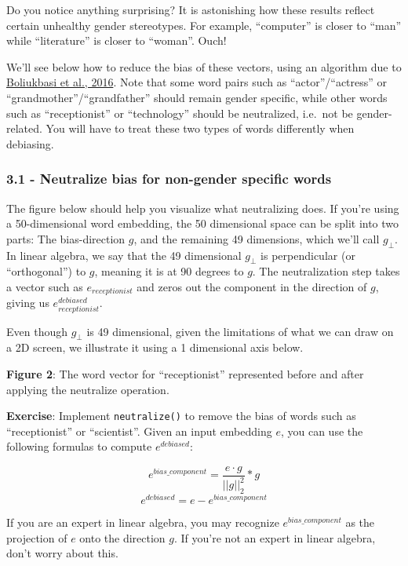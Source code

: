 \documentclass[11pt]{article}
\begin{document}
    Do you notice anything surprising? It is astonishing how these results
reflect certain unhealthy gender stereotypes. For example, ``computer''
is closer to ``man'' while ``literature'' is closer to ``woman''. Ouch!

We'll see below how to reduce the bias of these vectors, using an
algorithm due to \href{https://arxiv.org/abs/1607.06520}{Boliukbasi et
al., 2016}. Note that some word pairs such as ``actor''/``actress'' or
``grandmother''/``grandfather'' should remain gender specific, while
other words such as ``receptionist'' or ``technology'' should be
neutralized, i.e.~not be gender-related. You will have to treat these
two types of words differently when debiasing.

\subsubsection{3.1 - Neutralize bias for non-gender specific
words}\label{neutralize-bias-for-non-gender-specific-words}

The figure below should help you visualize what neutralizing does. If
you're using a 50-dimensional word embedding, the 50 dimensional space
can be split into two parts: The bias-direction $g$, and the remaining
49 dimensions, which we'll call $g_{\perp}$. In linear algebra, we say
that the 49 dimensional $g_{\perp}$ is perpendicular (or ``orthogonal'')
to $g$, meaning it is at 90 degrees to $g$. The neutralization step
takes a vector such as $e_{receptionist}$ and zeros out the component in
the direction of $g$, giving us $e_{receptionist}^{debiased}$.

Even though $g_{\perp}$ is 49 dimensional, given the limitations of what
we can draw on a 2D screen, we illustrate it using a 1 dimensional axis
below.

\textbf{Figure 2}: The word vector for ``receptionist'' represented
before and after applying the neutralize operation.

\textbf{Exercise}: Implement \texttt{neutralize()} to remove the bias of
words such as ``receptionist'' or ``scientist''. Given an input
embedding $e$, you can use the following formulas to compute
$e^{debiased}$:

\[e^{bias\_component} = \frac{e \cdot g}{||g||_2^2} * g\tag{2}\]
\[e^{debiased} = e - e^{bias\_component}\tag{3}\]

If you are an expert in linear algebra, you may recognize
$e^{bias\_component}$ as the projection of $e$ onto the direction $g$.
If you're not an expert in linear algebra, don't worry about this.
\end{document}
